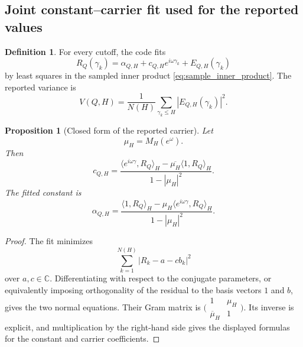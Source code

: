 \documentclass[11pt]{amsart}
\numberwithin{equation}{section}
\theoremstyle{plain}
\newtheorem{proposition}[theorem]{Proposition}
\theoremstyle{definition}
\newtheorem{definition}[theorem]{Definition}
\theoremstyle{remark}
\newcommand{\1}{\mathbf{1}}
\begin{document}
\subsection{Joint constant--carrier fit used for the reported values}
\label{subsec:numerical_joint_fit}

\begin{definition}
\label{def:numerical_joint_fit}
For every cutoff, the code fits
\begin{equation}
R_Q(\gamma_k)
=
\alpha_{Q,H}+c_{Q,H}e^{i\omega\gamma_k}+E_{Q,H}(\gamma_k)
\label{eq:numerical_joint_model}
\end{equation}
by least squares in the sampled inner product
\eqref{eq:sample_inner_product}.  The reported variance is
\begin{equation}
V(Q,H)
=
\frac1{N(H)}
\sum_{\gamma_k\leq H}|E_{Q,H}(\gamma_k)|^2.
\label{eq:numerical_reported_variance}
\end{equation}
\end{definition}

\begin{proposition}[Closed form of the reported carrier]
\label{prop:numerical_joint_carrier}
Let
\begin{equation}
\mu_H=M_H(e^\omega).
\label{eq:numerical_muH}
\end{equation}
Then
\begin{equation}
\boxed{
c_{Q,H}
=
\frac{
\langle e^{i\omega\gamma},R_Q\rangle_H
-
\overline{\mu_H}\langle1,R_Q\rangle_H
}{1-|\mu_H|^2}.
}
\label{eq:numerical_joint_carrier}
\end{equation}
The fitted constant is
\begin{equation}
\alpha_{Q,H}
=
\frac{
\langle1,R_Q\rangle_H
-
\mu_H\langle e^{i\omega\gamma},R_Q\rangle_H
}{1-|\mu_H|^2}.
\label{eq:numerical_joint_constant}
\end{equation}
\end{proposition}

\begin{proof}
The fit minimizes
\begin{equation}
\sum_{k=1}^{N(H)}|R_k-a-cb_k|^2
\label{eq:numerical_joint_objective_proof}
\end{equation}
over \(a,c\in\mathbb C\).  Differentiating with respect to the conjugate
parameters, or equivalently imposing orthogonality of the residual to the
basis vectors \(1\) and \(b\), gives the two normal equations.  Their Gram
matrix is
\(\bigl(\begin{smallmatrix}1&\mu_H\\\overline\mu_H&1\end{smallmatrix}\bigr)\).
Its inverse is explicit, and multiplication by the right-hand side gives
the displayed formulas for the constant and carrier coefficients.
\end{proof}
\end{document}
